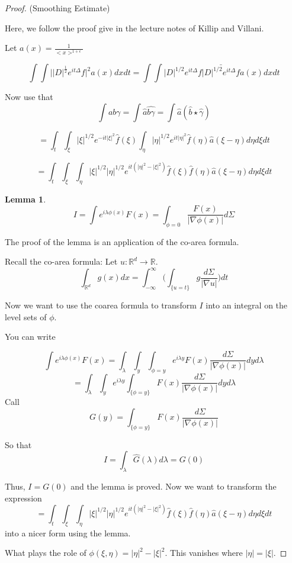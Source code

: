 \documentclass[11pt]{amsart}
\theoremstyle{plain}
\numberwithin{equation}{section}
\newtheorem{lemm}[thm]{Lemma}
\theoremstyle{remark}
\begin{document}
\begin{proof} (Smoothing Estimate)

Here, we follow the proof give in the lecture notes of Killip and Villani. 

Let $a(x)=\frac{1}{<x>^{1+\epsilon}}$

$$\int \int \big | |D|^\frac{1}{2} e^{it\Delta} f\big |^2 a(x)dxdt= \int \int  |D|^{1/2} e^{it\Delta}f \bar{|D|^{1/2} e^{it\Delta}f} a(x) dx dt $$

Now use that $$\int ab\gamma = \int \hat{a}\hat{b\gamma}=\int\hat{a}( \hat{b}\star \hat{\gamma})$$

$$=\int_{t} \int_{\xi} |\xi|^{1/2}e^{-it|\xi|^2} \hat{f}(\xi) \int_\eta |\eta|^{1/2} e^{it|\eta|^2} \hat{f}(\eta)\hat{a}(\xi-\eta)d\eta d\xi dt$$

$$=\int_{t} \int_{\xi}\int_\eta  |\xi|^{1/2} |\eta|^{1/2} e^{it(|\eta|^2-|\xi|^2)} \hat{f}(\xi)\hat{f}(\eta)\hat{a}(\xi-\eta)d\eta d\xi dt$$


\begin{lemm}
$$I=\int e^{i\lambda \phi(x)}F(x)= \int_{\phi=0} \frac{F(x)}{|\nabla\phi(x)|}d\Sigma$$
\end{lemm}

The proof of the lemma is an application of the co-area formula. 

Recall the co-area formula: 
Let $u:\mathbb{R}^d \rightarrow \mathbb{R}.$
$$\int_{\mathbb{R}^d} g(x)dx = \int_{-\infty}^{\infty} \big ( \int_{\{ u=t\} } g  \frac{d\Sigma}{|\nabla u|} \big ) dt $$

Now we want to use the coarea formula to transform $I$ into an integral on the level sets of $\phi.$

You can write

$$\int e^{i\lambda \phi(x)}F(x)= \int_{\lambda}  \int_y \int_{\phi=y} e^{i\lambda y} F(x) \frac{d\Sigma}{|\nabla \phi(x)|}dyd\lambda $$
$$= \int_{\lambda}  \int_{y} e^{i\lambda y} \int_{\{\phi=y\}} F(x) \frac{d\Sigma}{|\nabla \phi(x)|}dyd\lambda $$
Call $$G(y)= \int_{\{\phi=y\}} F(x) \frac{d\Sigma}{|\nabla \phi(x)|} $$

So that $$I=\int_\lambda \hat{G}(\lambda)d\lambda=G(0)$$

Thus, $I=G(0)$ and the lemma is proved. Now we want to transform the expression $$=\int_{t} \int_{\xi}\int_\eta  |\xi|^{1/2} |\eta|^{1/2} e^{it(|\eta|^2-|\xi|^2)} \hat{f}(\xi)\hat{f}(\eta)\hat{a}(\xi-\eta)d\eta d\xi dt$$ into a nicer form using the lemma. 


What plays the role of $\phi(\xi,\eta)=|\eta|^2-|\xi|^2.$ This vanishes where $|\eta|=|\xi|.$


\end{proof}
\end{document}
